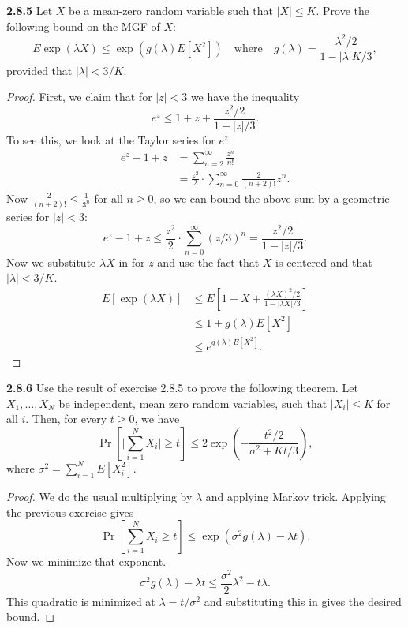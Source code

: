 \documentclass[11pt,letterpaper]{report}
\begin{document}
\noindent\textbf{2.8.5}
Let $X$ be a mean-zero random variable such that $|X|\leq K$. Prove the following bound on the MGF of $X$:
\[
E\exp(\lambda X)\leq \exp(g(\lambda)E[X^2])\quad\text{where}\quad g(\lambda) = \frac{\lambda^2/2}{1-|\lambda|K/3},
\]
provided that $|\lambda|<3/K$.
\begin{proof}
	First, we claim that for $|z|<3$ we have the inequality
	\[
	e^z \leq 1 + z + \frac{z^2/2}{1 - |z|/3}.
	\]
	To see this, we look at the Taylor series for $e^z$.
	\begin{align*}
		e^z - 1 + z  &= \sum_{n=2}^\infty \frac{z^n}{n!}\\
		&= \frac{z^2}{2}\cdot \sum_{n=0}^\infty \frac{2}{(n+2)!}z^n.
	\end{align*}
	Now $\frac{2}{(n+2)!}\leq \frac{1}{3^n}$ for all $n\geq 0$, so we can bound the above sum by a geometric series for $|z|<3$:
	\[
	e^z - 1 + z \leq \frac{z^2}{2}\cdot \sum_{n=0}^\infty (z/3)^n = \frac{z^2/2}{1- |z|/3}.
	\]
	Now we substitute $\lambda X$ in for $z$ and use the fact that $X$ is centered and that $|\lambda|<3/K$.
	\begin{align*}
		E[\exp(\lambda X)] & \leq E\left[1 + X + \frac{(\lambda X)^2/2}{1-|\lambda X|/3} \right]\\
		&\leq 1 + g(\lambda)E[X^2]\\
		&\leq e^{g(\lambda)E[X^2]}.
	\end{align*}
\end{proof}










\noindent\textbf{2.8.6}
Use the result of exercise 2.8.5 to prove the following theorem. Let $X_1, \ldots, X_N$ be independent, mean zero random variables, such that $|X_i|\leq K$ for all $i$. Then, for every $t\geq 0$, we have
\[
\Pr\left[ \bigg|\sum_{i=1}^NX_i\bigg| \geq t\right] \leq 2\exp\left( -\frac{t^2/2}{\sigma^2 + Kt/3}\right),
\]
where $\sigma^2 = \sum_{i=1}^NE[X_i^2]$.
\begin{proof}
	We do the usual multiplying by $\lambda$ and applying Markov trick. Applying the previous exercise gives
	\[
	\Pr\left[ \sum_{i=1}^NX_i \geq t\right] \leq \exp\left( \sigma^2g(\lambda) - \lambda t\right).
	\]
	Now we minimize that exponent.
	\[
	\sigma^2g(\lambda) - \lambda t \leq \frac{\sigma^2}{2}\lambda^2 - t\lambda.
	\]
	This quadratic is minimized at $\lambda = t/\sigma^2$ and substituting this in gives the desired bound.
\end{proof}
\end{document}
